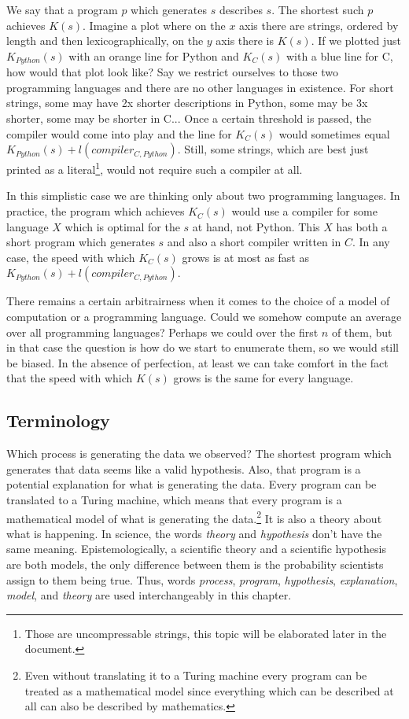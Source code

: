 We say that a program $p$ which generates $s$ describes $s$.
The shortest such $p$ achieves $K(s)$.
Imagine a plot where on the $x$ axis there are strings, ordered by length and then lexicographically, on the $y$ axis there is $K(s)$.
If we plotted just $K_{Python}(s)$ with an orange line for Python and $K_C(s)$ with a blue line for C, how would that plot look like?
Say we restrict ourselves to those two programming languages and there are no other languages in existence.
For short strings, some may have 2x shorter descriptions in Python, some may be 3x shorter, some may be shorter in C...
Once a certain threshold is passed, the compiler would come into play and the line for $K_C(s)$ would sometimes equal $K_{Python}(s) + l(compiler_{C,Python})$.
Still, some strings, which are best just printed as a literal\footnote{Those are uncompressable strings, this topic will be elaborated later in the document.}, would not require such a compiler at all.

In this simplistic case we are thinking only about two programming languages.
In practice, the program which achieves $K_C(s)$ would use a compiler for some language $X$ which is optimal for the $s$ at hand, not Python. 
This $X$ has both a short program which generates $s$ and also a short compiler written in $C$.
In any case, the speed with which $K_C(s)$ grows is at most as fast as $K_{Python}(s) + l(compiler_{C,Python})$.

There remains a certain arbitrairness when it comes to the choice of a model of computation or a programming language.
Could we somehow compute an average over all programming languages?
Perhaps we could over the first $n$ of them, but in that case the question is how do we start to enumerate them, so we would still be biased.
In the absence of perfection, at least we can take comfort in the fact that the speed with which $K(s)$ grows is the same for every language.

\newpage

\subsection{Terminology}

Which process is generating the data we observed?
The shortest program which generates that data seems like a valid hypothesis.
Also, that program is a potential explanation for what is generating the data.
Every program can be translated to a Turing machine, which means that every program is a mathematical model of what is generating the data.\footnote{Even without translating it to a Turing machine every program can be treated as a mathematical model since everything which can be described at all can also be described by mathematics.}
It is also a theory about what is happening.
In science, the words \textit{theory} and \textit{hypothesis} don't have the same meaning.
Epistemologically, a scientific theory and a scientific hypothesis are both models, the only difference between them is the probability scientists assign to them being true.
Thus, words \textit{process}, \textit{program}, \textit{hypothesis}, \textit{explanation}, \textit{model}, and \textit{theory} are used interchangeably in this chapter.

